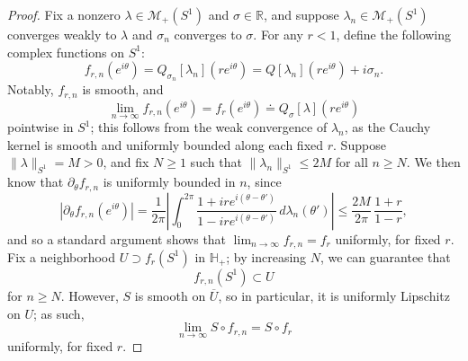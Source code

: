\documentclass[10pt,a4paper]{amsart}
\newcommand{\HH}{\mathbb H}
\newcommand{\RR}{\mathbb R}
\newcommand{\cM}{\mathcal M}
\newcommand{\dave}[1]{#1}\newcommand{\davebegin}{}\newcommand{\daveend}{}\newcommand{\george}[1]{#1}
\newcommand{\ovl}[1]{{\overline{#1}}}
\begin{document}
\begin{proof}
    Fix a nonzero $\lambda\in\cM_+(S^1)$ and $\sigma\in\RR$, and suppose $\lambda_n\in\cM_+(S^1)$ converges weakly to $\lambda$ and $\sigma_n$ converges to $\sigma$. For any $r<1$, define the following complex functions on $S^1$:
    \[f_{r,n}(e^{i\theta}) = Q_{\sigma_n}[\lambda_n](re^{i\theta}) = Q[\lambda_n](re^{i\theta}) + i\sigma_n.\]
    Notably, $f_{r,n}$ is smooth, and 
    \[\lim_{n\to\infty} f_{r,n}(e^{i\theta}) = f_r(e^{i\theta})\doteq Q_\sigma[\lambda](re^{i\theta})\]
    pointwise in $S^1$; this follows from the weak convergence of $\lambda_n$, as the Cauchy kernel is smooth and uniformly bounded along each fixed $r$. Suppose $\|\lambda\|_{S^1} = M>0$, and fix $N\geq 1$ such that $\|\lambda_{n}\|_{S^1}\leq 2M$ for all $n\geq N$. We then know that $\partial_\theta f_{r,n}$ is uniformly bounded in $n$, since
    \[|\partial_\theta f_{r,n}(e^{i\theta})| = \frac{1}{2\pi}\left|\int_0^{2\pi}\frac{1+ire^{i(\theta-\theta')}}{1-ire^{i(\theta-\theta')}}\,d\lambda_n(\theta')\right| \leq \frac{2M}{2\pi}\,\frac{1+r}{1-r},\]
    \dave{and so a standard argument shows that $\lim_{n\to\infty} f_{r,n}=f_r$
    uniformly, for fixed $r$}. Fix a neighborhood $U\supset f_r(S^1)$ in $\HH_+$; by increasing $N$, we can guarantee that 
    \[f_{r,n}(S^1)\subset U\]
    for $n\geq N$. However, $S$ is smooth on $\ovl{U}$, so in particular, it is uniformly Lipschitz on $U$; as such,
    \[\lim_{n\to\infty} S\circ f_{r,n} = S\circ f_r\]
    uniformly, for fixed $r$.


\end{proof}
\end{document}

